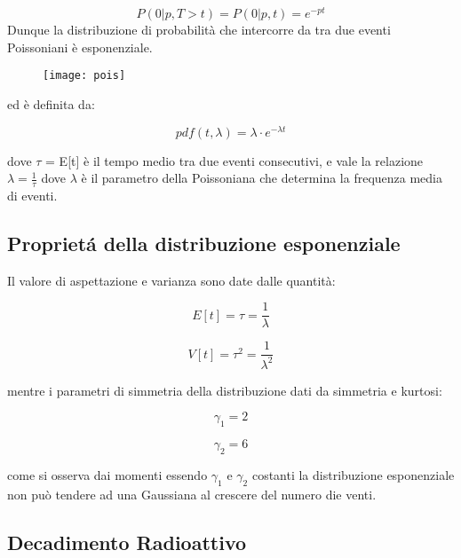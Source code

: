 \begin{equation*}
	P(0 \vert p, T>t) = P(0 \vert p, t) = e^{-pt}
\end{equation*}
 Dunque la distribuzione di probabilit\`{a} che intercorre da tra due eventi Poissoniani \`{e} esponenziale.
\begin{figure}[ht]
\vspace{0.2in}
\texttt{[image: pois]}	
\centering
\vspace{0.2in}
\end{figure}

ed \`{e} definita da:

\begin{equation}
	pdf(t,\lambda) = \lambda \cdot e^{-\lambda t}
\end{equation}

dove $\tau$ = E[t] \`{e} il tempo medio tra due eventi consecutivi, e vale la relazione $\lambda = \frac{1}{\tau}$ dove $\lambda$ \`{e} il parametro della Poissoniana che determina la frequenza media di eventi. 

\subsection{Propriet\'{a} della distribuzione esponenziale}

Il valore di aspettazione e varianza sono date dalle quantit\`{a}:

\begin{equation}
	E[t] = \tau = \dfrac{1}{\lambda}
\end{equation}

\begin{equation}
	V[t] = \tau^2 = \dfrac{1}{\lambda^2}
\end{equation}

mentre i parametri di simmetria della distribuzione dati da simmetria e kurtosi:

\begin{equation}
	\gamma_1 = 2
\end{equation}

\begin{equation}
	\gamma_2 = 6
\end{equation}

come si osserva dai momenti essendo $\gamma_1$ e $\gamma_2$ costanti la distribuzione esponenziale non pu\`{o} tendere ad una Gaussiana al crescere del numero die venti.

\subsection{Decadimento Radioattivo}

